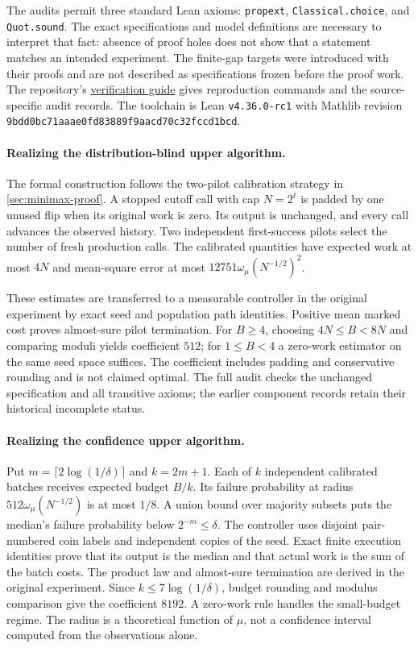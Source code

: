 The audits permit three standard Lean axioms: \texttt{propext},
\texttt{Classical.choice}, and \texttt{Quot.sound}.
The exact specifications and model definitions are necessary to interpret
that fact: absence of proof holes does not show that a statement matches
an intended experiment. The finite-gap targets were introduced with their
proofs and are not described as specifications frozen before the proof work.
The repository's \href{https://github.com/davidiach/adaptive-threshold-estimation/blob/eabf274cb42d4bff4daab6b58568ad6169e7f0a7/docs/VERIFY.md}{verification guide}
gives reproduction commands and the source-specific audit records.
The toolchain is Lean \texttt{v4.36.0-rc1} with Mathlib revision
\nolinkurl{9bdd0bc71aaae0fd83889f9aacd70c32fccd1bcd}.

\paragraph{Realizing the distribution-blind upper algorithm.}
The formal construction follows the two-pilot calibration strategy in
\cref{sec:minimax-proof}. A stopped cutoff call with cap $N=2^\ell$ is
padded by one unused flip when its original work is zero. Its output
is unchanged, and every call advances the observed history. Two independent
first-success pilots select the number of fresh production calls. The
calibrated quantities have expected work at most $4N$ and mean-square
error at most $12751\omega_\mu(N^{-1/2})^2$.

These estimates are transferred to a measurable controller in the original
experiment by exact seed and population path identities. Positive mean
marked cost proves almost-sure pilot termination. For $B\ge4$, choosing
$4N\le B<8N$ and comparing moduli yields coefficient $512$; for $1\le B<4$
a zero-work estimator on the same seed space suffices. The coefficient
includes padding and conservative rounding and is not claimed optimal.
The full audit checks the unchanged specification and all transitive axioms;
the earlier component records retain their historical incomplete status.

\paragraph{Realizing the confidence upper algorithm.}
Put $m=\lceil2\log(1/\delta)\rceil$ and $k=2m+1$. Each of $k$ independent
calibrated batches receives expected budget $B/k$. Its failure probability
at radius $512\omega_\mu(N^{-1/2})$ is at most $1/8$. A union bound over
majority subsets puts the median's failure probability below $2^{-m}\le\delta$.
The controller uses disjoint pair-numbered coin labels and independent
copies of the seed. Exact finite execution identities prove that its
output is the median and that actual work is the sum of the batch costs.
The product law and almost-sure termination are derived in the original
experiment. Since $k\le7\log(1/\delta)$, budget rounding and modulus
comparison give the coefficient $8192$. A zero-work rule handles the
small-budget regime. The radius is a theoretical function of $\mu$, not
a confidence interval computed from the observations alone.


